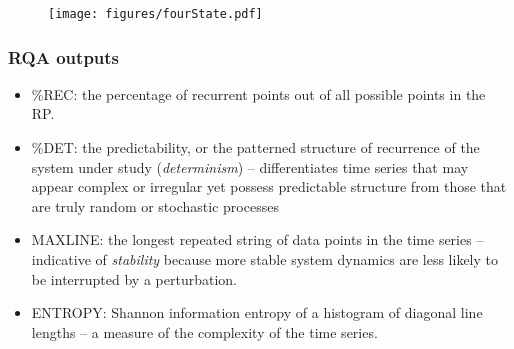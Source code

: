 \documentclass[aspectratio=43, notes]{beamer}
\begin{document}
\begin{frame}
\frametitle{}
\begin{figure}
	\centering
	\texttt{[image: figures/fourState.pdf]}
	\label{fig:4state}
\end{figure}
\end{frame}

\begin{frame}
\frametitle{RQA outputs} 
\begin{itemize}[label=$\bullet$]
	\item \%REC: the percentage of recurrent points out of all possible points in the RP. 
	\item \%DET: the predictability, or the patterned structure of recurrence of the system under study (\emph{determinism}) -- differentiates time series that may appear complex or irregular yet possess predictable structure from those that are truly random or stochastic processes
	\item MAXLINE: the longest repeated string of data points in the time series -- indicative of \emph{stability} because more stable system dynamics are less likely to be interrupted by a perturbation.
	\item ENTROPY: Shannon information entropy of a histogram of diagonal line lengths --  a measure of the complexity of the time series.
\end{itemize}
\end{frame}



\end{document}
